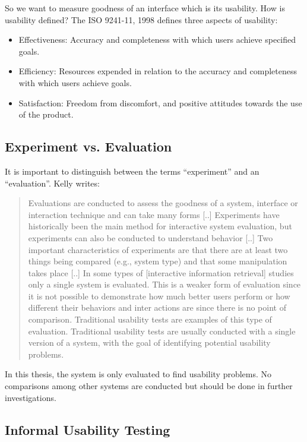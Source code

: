\documentclass[11pt]{report}
\begin{document}
So we want to measure goodness of an interface which is its usability. How is usability defined? The ISO 9241-11, 1998 \cite{ISO} defines three aspects of usability:
\begin{itemize}
	\item Effectiveness: Accuracy and completeness with which users achieve specified goals.
	\item Efficiency: Resources expended in relation to the accuracy and completeness with which users achieve goals.
	\item Satisfaction: Freedom from discomfort, and positive attitudes towards the use of the product.
\end{itemize}

\subsection{Experiment vs. Evaluation}

It is important to distinguish between the terms ``experiment'' and an ``evaluation''. Kelly \cite{Kelly2007} writes:
\begin{quote}
Evaluations are conducted to assess the goodness of a system, interface or interaction technique and can take many forms [..] Experiments have historically been the main method for interactive system evaluation, but experiments can also be conducted to understand behavior [..] Two important characteristics of experiments are that there are at least two things being compared (e.g., system type) and that some manipulation takes place [..] In some types of [interactive information retrieval] studies only a single system is evaluated. This is a weaker form of evaluation since it is not possible to demonstrate how much better users perform or how different their behaviors and inter actions are since there is no point of comparison. Traditional usability tests are examples of this type of evaluation. Traditional usability tests are usually conducted with a single version of a system, with the goal of identifying potential usability problems.	
\end{quote}

In this thesis, the system is only evaluated to find usability problems. No comparisons among other systems are conducted but should be done in further investigations.

\subsection{Informal Usability Testing}
\end{document}
